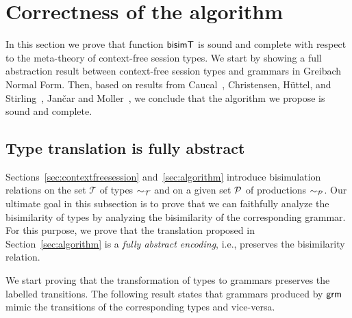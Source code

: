 \section{Correctness of the algorithm}
\label{sec:correctness}

In this section we prove that function $\mathsf{bisimT}$ is sound and complete
with respect to the meta-theory of context-free session types.
%
We start by showing a full abstraction result between context-free
session types and grammars in Greibach Normal Form.
%
Then, based on results from Caucal~\cite{caucal1986decidabilite},
Christensen, H{\"{u}}ttel, and
Stirling~\cite{DBLP:journals/iandc/ChristensenHS95}, Jan{\v{c}}ar and
Moller~\cite{janvcar1999techniques}, we conclude that the algorithm 
we propose is sound and complete.

\subsection{Type translation is fully abstract}

Sections~\ref{sec:contextfreesession} and~\ref{sec:algorithm}
introduce bisimulation relations on the set $\mathcal T$ of types
$\sim_\mathcal T$ and on a given set $\mathcal P$ of productions
$\sim_\mathcal P$.  Our ultimate goal in this subsection is to prove that
we can faithfully analyze the bisimilarity of types by analyzing the
bisimilarity of the corresponding grammar. For this purpose, we prove
that the translation proposed in Section~\ref{sec:algorithm} is a
\emph{fully abstract encoding}, i.e., preserves the bisimilarity
relation. %

We start proving that the transformation of types to grammars preserves
the labelled transitions.
%
%
The following result states that grammars produced by
$\mathsf{grm}$ mimic the transitions of the corresponding types
and vice-versa.

